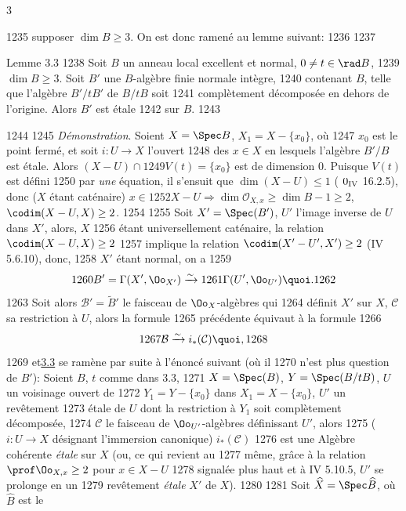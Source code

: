 3	\documentclass[10pt]{../fichiers-configuration-latex/smfart}
\begin{document}
  1235	supposer $\dim B\geq 3$. On est donc ramené au lemme suivant:
  1236	
  1237	\begin{enonce*}{Lemme 3.3}
  1238	Soit $B$ un anneau local excellent et normal, $0\neq t\in \rad B$,
  1239	$\dim B\geq 3$. Soit $B'$ une $B$-algèbre finie normale intègre,
  1240	contenant $B$, telle que l'algèbre $B'/tB'$ de $B/tB$ soit
  1241	complètement décomposée en dehors de l'origine. Alors $B'$ est étale
  1242	sur $B$.
  1243	\end{enonce*}
  1244	
  1245		\emph{Démonstration}. Soient $X=\Spec B$, $X_1=X-\{x_{0}\}$, où
  1247	$x_{0}$ est le point fermé, et soit $i:U\rightarrow X$ l'ouvert
  1248	des $x\in X$ en lesquels l'algèbre $B'/B$ est étale. Alors $(X-U)\cap
  1249	V(t)=\{x_{0}\}$ est de dimension $0$. Puisque $V(t)$ est défini
  1250	par \emph{une} équation, il s'ensuit que $\dim(X-U)\leq 1$ (	$0_{\text{\rm IV}}$ 16.2.5), donc ($X$ étant caténaire) $x\in
  1252	X-U\Rightarrow \dim \mathcal{O}_{X,x}\geq \dim B-1\geq 2$, 	$\codim(X-U,X)\geq 2$.
  1254	
  1255	Soit $X'=\Spec(B')$, $U'$ l'image inverse de $U$ dans $X'$, alors, $X$
  1256	étant universellement caténaire, la relation $\codim(X-U,X)\geq 2$
  1257	implique la relation $\codim(X'-U',X')\geq 2$ (\EGA IV 5.6.10), donc,
  1258	$X'$ étant normal, on a
  1259	$$
  1260	B'=\Gamma(X',\Oo_{X'})\xrightarrow{\sim}
  1261	\Gamma(U',\Oo_{U'}){\quoi}.
  1262	$$
  1263	Soit alors $\mathcal{B}'=\widetilde{B}'$ le faisceau de $\Oo_X$-algèbres qui
  1264	définit $X'$ sur $X$, $\mathcal{C}$ sa restriction à $U$, alors la formule
  1265	précédente équivaut à la formule
  1266	$$
  1267	\mathcal{B}\xrightarrow{\sim}i_{\ast}(\mathcal{C}){\quoi},
  1268	$$
  1269	et\pageoriginale \hyperref[XV.lem3.3]{3.3} se ramène par suite à l'énoncé suivant (où il
  1270	n'est plus question de $B'$): Soient $B$, $t$ comme dans 3.3,
  1271	$X=\Spec(B)$, $Y=\Spec(B/tB)$, $U$ un voisinage ouvert de
  1272	$Y_1=Y-\{x_{0}\}$ dans $X_1=X-\{x_{0}\}$, $U'$ un revêtement
  1273	étale de $U$ dont la restriction à $Y_1$ soit complètement décomposée,
  1274	$\mathcal{C}$ le faisceau de $\Oo_{U'}$-algèbres définissant $U'$, alors
  1275	($i:U\rightarrow X$ désignant l'immersion canonique) $i_{\ast}(\mathcal{C})$
  1276	est une Algèbre cohérente \emph{étale} sur $X$ (ou, ce qui revient au
  1277	même, grâce à la relation $\prof \Oo_{X,x}\geq 2$ pour $x\in X-U$
  1278	signalée plus haut et à \EGA IV 5.10.5, $U'$ se prolonge en un
  1279	revêtement \emph{étale} $X'$ de $X$).
  1280	
  1281	Soit $\widehat{X}=\Spec\widehat{B}$, où $\widehat{B}$ est le
\end{document}
